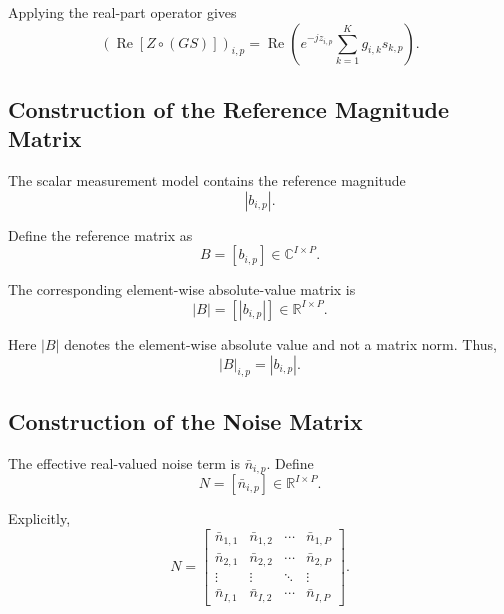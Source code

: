 \documentclass[12pt,a4paper]{article}
\begin{document}
Applying the real-part operator gives
\begin{equation}
\left(
\operatorname{Re}[Z\circ(GS)]
\right)_{i,p}
=
\operatorname{Re}
\left(
e^{-jz_{i,p}}
\sum_{k=1}^{K}
g_{i,k}s_{k,p}
\right).
\tag{150}
\end{equation}

\subsection{Construction of the Reference Magnitude Matrix}

The scalar measurement model contains the reference magnitude
\begin{equation}
|b_{i,p}|.
\tag{151}
\end{equation}

Define the reference matrix as
\begin{equation}
\boxed{
B=[b_{i,p}]
\in
\mathbb{C}^{I\times P}
}.
\tag{152}
\end{equation}

The corresponding element-wise absolute-value matrix is
\begin{equation}
\boxed{
|B|=[|b_{i,p}|]
\in
\mathbb{R}^{I\times P}
}.
\tag{153}
\end{equation}

Here $|B|$ denotes the element-wise absolute value and not a matrix
norm. Thus,
\begin{equation}
|B|_{i,p}
=
|b_{i,p}|.
\tag{154}
\end{equation}

\subsection{Construction of the Noise Matrix}

The effective real-valued noise term is $\bar n_{i,p}$. Define
\begin{equation}
\boxed{
N=[\bar n_{i,p}]
\in
\mathbb{R}^{I\times P}
}.
\tag{155}
\end{equation}

Explicitly,
\begin{equation}
N=
\begin{bmatrix}
\bar n_{1,1} & \bar n_{1,2} & \cdots & \bar n_{1,P}\\
\bar n_{2,1} & \bar n_{2,2} & \cdots & \bar n_{2,P}\\
\vdots & \vdots & \ddots & \vdots\\
\bar n_{I,1} & \bar n_{I,2} & \cdots & \bar n_{I,P}
\end{bmatrix}.
\tag{156}
\end{equation}
\end{document}
